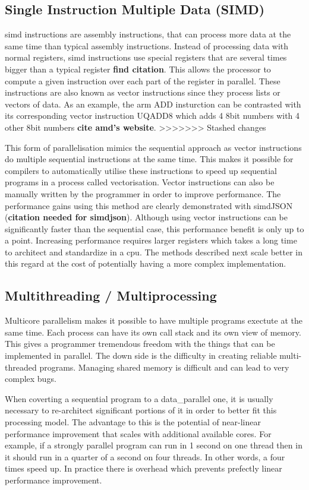 \subsection{Single Instruction Multiple Data (SIMD)}
\ac{simd} instructions are assembly instructions, that can process more data
at the same time than typical assembly instructions. Instead of processing data
with normal registers, \ac{simd} instructions use special registers that are
several times bigger than a typical register \textbf{find citation}. This allows
the processor to compute a given instruction over each part of the register in
parallel. These instructions are also known as vector instructions since they
process lists or vectors of data. As an example, the arm ADD insturction can be
contrasted with its corresponding vector instruction UQADD8 which adds 4 8bit
numbers with 4 other 8bit numbers \textbf{cite amd's website}.
>>>>>>> Stashed changes

This form of parallelisation mimics the sequential approach as vector
instructions do multiple sequential instructions at the same time. This makes
it possible for compilers to automatically utilise these instructions to speed
up sequential programs in a process called vectorisation. Vector instructions
can also be manually written by the programmer in order to improve performance.
The performance gains using this method are clearly demonstrated with simdJSON
(\textbf{citation needed for simdjson}). Although using vector instructions can
be significantly faster than the sequential case, this performance benefit is
only up to a point. Increasing performance requires larger registers which takes
a long time to architect and standardize in a \ac{cpu}. The methods described
next scale better in this regard at the cost of potentially having a more
complex implementation.

\subsection{Multithreading / Multiprocessing}
Multicore parallelism makes it possible to have multiple programs exectute at
the same time. Each process can have its own call stack and its own view of
memory. This gives a programmer tremendous freedom with the things that can be
implemented in parallel. The down side is the difficulty in creating reliable
multi-threaded programs. Managing shared memory is difficult and can lead to
very complex bugs.

When coverting a sequential program to a \gls{data_parallel} one, it is usually
necessary to re-architect significant portions of it in order to better fit
this processing model. The advantage to this is the potential of near-linear
performance improvement that scales with additional available cores. For
example, if a strongly parallel program can run in 1 second on one thread then
in it should run in a quarter of a second on four threads. In other words, a
four times speed up. In practice there is overhead which prevents prefectly
linear performance improvement.


